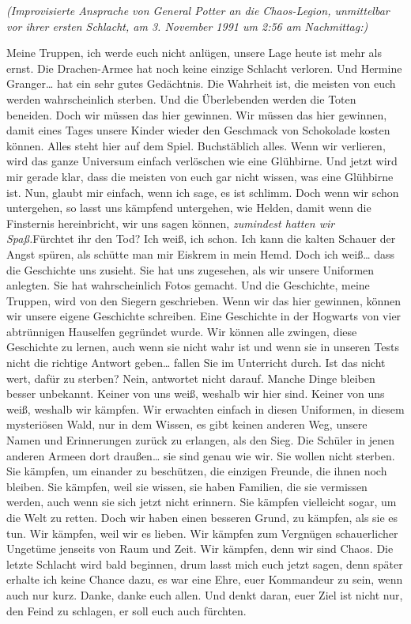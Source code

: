 {\later

\emph{(Improvisierte Ansprache von General Potter an die Chaos-Legion, unmittelbar vor ihrer ersten Schlacht, am 3. November 1991 um 2:56 am Nachmittag:)}

Meine Truppen, ich werde euch nicht anlügen, unsere Lage heute ist mehr als ernst. Die Drachen-Armee hat noch keine einzige Schlacht verloren. Und Hermine Granger… hat ein sehr gutes Gedächtnis. Die Wahrheit ist, die meisten von euch werden wahrscheinlich sterben. Und die Überlebenden werden die Toten beneiden. Doch wir müssen das hier gewinnen. Wir müssen das hier gewinnen, damit eines Tages unsere Kinder wieder den Geschmack von Schokolade kosten können. Alles steht hier auf dem Spiel. Buchstäblich alles. Wenn wir verlieren, wird das ganze Universum einfach verlöschen wie eine Glühbirne. Und jetzt wird mir gerade klar, dass die meisten von euch gar nicht wissen, was eine Glühbirne ist. Nun, glaubt mir einfach, wenn ich sage, es ist schlimm. Doch wenn wir schon untergehen, so lasst uns kämpfend untergehen, wie Helden, damit wenn die Finsternis hereinbricht, wir uns sagen können, \emph{zumindest hatten wir Spaß.}Fürchtet ihr den Tod? Ich weiß, ich schon. Ich kann die kalten Schauer der Angst spüren, als schütte man mir Eiskrem in mein Hemd. Doch ich weiß… dass die Geschichte uns zusieht. Sie hat uns zugesehen, als wir unsere Uniformen anlegten. Sie hat wahrscheinlich Fotos gemacht. Und die Geschichte, meine Truppen, wird von den Siegern geschrieben. Wenn wir das hier gewinnen, können wir unsere eigene Geschichte schreiben. Eine Geschichte in der Hogwarts von vier abtrünnigen Hauselfen gegründet wurde. Wir können alle zwingen, diese Geschichte zu lernen, auch wenn sie nicht wahr ist und wenn sie in unseren Tests nicht die richtige Antwort geben… fallen Sie im Unterricht durch. Ist das nicht wert, dafür zu sterben? Nein, antwortet nicht darauf. Manche Dinge bleiben besser unbekannt. Keiner von uns weiß, weshalb wir hier sind. Keiner von uns weiß, weshalb wir kämpfen. Wir erwachten einfach in diesen Uniformen, in diesem mysteriösen Wald, nur in dem Wissen, es gibt keinen anderen Weg, unsere Namen und Erinnerungen zurück zu erlangen, als den Sieg. Die Schüler in jenen anderen Armeen dort draußen… sie sind genau wie wir. Sie wollen nicht sterben. Sie kämpfen, um einander zu beschützen, die einzigen Freunde, die ihnen noch bleiben. Sie kämpfen, weil sie wissen, sie haben Familien, die sie vermissen werden, auch wenn sie sich jetzt nicht erinnern. Sie kämpfen vielleicht sogar, um die Welt zu retten. Doch wir haben einen besseren Grund, zu kämpfen, als sie es tun. Wir kämpfen, weil wir es lieben. Wir kämpfen zum Vergnügen schauerlicher Ungetüme jenseits von Raum und Zeit. Wir kämpfen, denn wir sind Chaos. Die letzte Schlacht wird bald beginnen, drum lasst mich euch jetzt sagen, denn später erhalte ich keine Chance dazu, es war eine Ehre, euer Kommandeur zu sein, wenn auch nur kurz. Danke, danke euch allen. Und denkt daran, euer Ziel ist nicht nur, den Feind zu schlagen, er soll euch auch fürchten.

}
